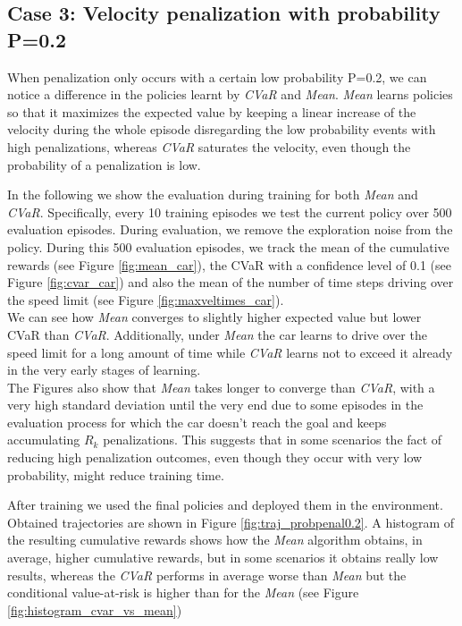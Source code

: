 \newpage
\subsection{Case 3: Velocity penalization with probability P=0.2 }
When penalization only occurs with a certain low probability P=0.2, we can notice a difference
in the policies learnt by \textit{CVaR} and \textit{Mean}.
\textit{Mean} learns policies so that it maximizes the expected
value by keeping a linear increase of the velocity during the whole episode disregarding the low probability events with high penalizations,
whereas \textit{CVaR} saturates the velocity, even though the
probability of a penalization is low.

In the following we show the evaluation during training for both \textit{Mean} and
\textit{CVaR}.
Specifically, every 10 training episodes we test the current policy over 500 evaluation episodes.
During evaluation, we remove the exploration noise from the policy.
During this 500 evaluation episodes, we track the mean of the cumulative rewards (see Figure \ref{fig:mean_car}),
the CVaR with a confidence level of 0.1  (see Figure \ref{fig:cvar_car}) and also the mean of the number of time steps
driving over the
speed limit (see Figure \ref{fig:maxveltimes_car}). \\
We can see how \textit{Mean} converges to slightly higher
expected value but lower CVaR than \textit{CVaR}. 
Additionally, under \textit{Mean} the car learns to drive over the speed limit for 
a long amount of time while \textit{CVaR} learns not to exceed it already
in the very early stages of learning.\\
The Figures also show that \textit{Mean} takes longer to converge than \textit{CVaR}, with a very high standard deviation
until the very end due to some episodes in the evaluation process for which the car doesn't reach the goal and keeps accumulating
$R_{k}$ penalizations. This suggests that in some scenarios the fact of reducing high penalization outcomes,
even though they occur with very low probability, might reduce training time.

After training we used the final policies and deployed them in the 
environment. Obtained trajectories are shown in Figure \ref{fig:traj_probpenal0.2}.
A histogram of the resulting cumulative rewards shows
how the \textit{Mean} algorithm obtains, in average, higher cumulative rewards, but in some scenarios it 
obtains really low results, whereas the \textit{CVaR} performs in average worse than \textit{Mean} 
but the conditional value-at-risk is higher than for the \textit{Mean} (see Figure \ref{fig:histogram_cvar_vs_mean})


